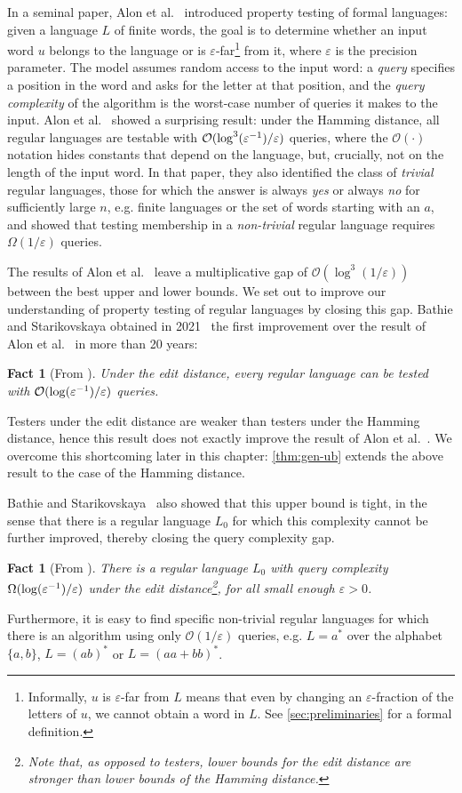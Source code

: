 \documentclass[letterpaper, USenglish, cleveref, autoref, thm-restate, numberwithinsect]{lipics-v2021}
\theoremstyle{theorem}
\newtheorem{fact}[theorem]{Fact}
\theoremstyle{definition}
\newcommand{\cO}{\mathcal{O}}
\newcommand{\eps}{\varepsilon}
\newcommand{\epslogeps}[1][]
{\ifthenelse{\equal{#1}{}}{\log(\eps^{-1})/\eps}{\log^{ #1 }(\eps^{-1})/\eps}}
\newcommand{\doc}{chapter\xspace}
\newcommand{\doc}{article\xspace}
\begin{document}
In a seminal paper, Alon et al.~\cite{alon2001regular} introduced property testing of formal languages: given a language $L$ of finite words, the goal is to determine whether an input word $u$ belongs to the language or is $\eps$-far\footnote{Informally, $u$ is $\eps$-far from $L$ means that even by changing an $\eps$-fraction of the letters of $u$, we cannot obtain a word in $L$. See \cref{sec:preliminaries} for a formal definition.} from it, where $\eps$ is the precision parameter.
The model assumes random access to the input word: a \emph{query} specifies a position in the word and asks for the letter at that position, and the \emph{query complexity} of the algorithm is the worst-case number of queries it makes to the input.
Alon et al.~\cite{alon2001regular} showed a surprising result: under the Hamming distance, all regular languages are testable with $\cO(\epslogeps[3])$ queries, where the $\cO(\cdot)$ notation hides constants that depend on the language, but, crucially, not on the length of the input word.
In that paper, they also identified the class of \emph{trivial} regular languages, those for which the answer is always \emph{yes} or always \emph{no} for sufficiently large $n$, e.g. finite languages or the set of words starting with an $a$, and showed that testing membership in a \emph{non-trivial} regular language requires $\Omega(1/\eps)$ queries.

The results of Alon et al.~\cite{alon2001regular} leave a multiplicative gap of $\cO(\log^3(1/\eps))$ between the best upper and lower bounds.
We set out to improve our understanding of property testing of regular languages by closing this gap.
Bathie and Starikovskaya obtained in 2021~\cite{bathie2021property} the first improvement over the result of Alon et al.~\cite{alon2001regular} in more than 20 years:
\begin{fact}[{From \cite[Theorem 5]{bathie2021property}}]
    Under the edit distance, every regular language can be tested with $\cO(\epslogeps)$ queries.
\end{fact}
Testers under the edit distance are weaker than testers under the Hamming distance, hence this result does not exactly improve the result of Alon et al.~\cite{alon2001regular}. We overcome this shortcoming later in this \doc: \cref{thm:gen-ub} extends the above result to the case of the Hamming distance.

Bathie and Starikovskaya~\cite{bathie2021property} also showed that this upper bound is tight, in the sense that there is a regular language $L_0$ for which this complexity cannot be further improved, thereby closing the query complexity gap.
\begin{fact}[{From \cite[Theorem 15]{bathie2021property}}]
    There is a regular language $L_0$ with query complexity $\Omega(\epslogeps)$ under the edit distance\footnote{Note that, as opposed to testers, lower bounds for the edit distance are stronger than lower bounds of the Hamming distance.}, for all small enough $\eps > 0$.
\end{fact}
Furthermore, it is easy to find specific non-trivial regular languages for which there is an algorithm using only $\cO(1/\eps)$ queries, e.g. $L = a^*$ over the alphabet $\{a,b\}$, $L = (ab)^*$ or $L = (aa + bb)^*$.
\end{document}
